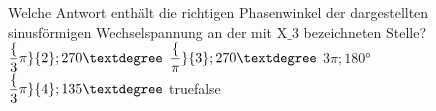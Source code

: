     {Welche Antwort enthält die richtigen Phasenwinkel der dargestellten sinusförmigen Wechselspannung an der mit X$\_3$ bezeichneten Stelle?}
    {$\dfrac\{3\pi\}\{2\}; 270 °$}
    {$\dfrac\{\pi\}\{3\}; 270 °$}
    {$3\pi; 180 °$}
    {$\dfrac\{3\pi\}\{4\}; 135 °$}
    {true}{false}